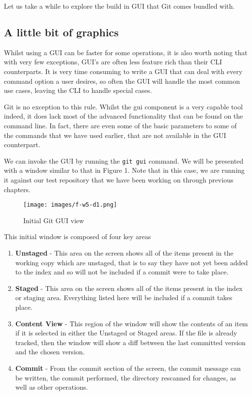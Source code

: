 Let us take a while to explore the build in GUI that Git comes bundled with.

\subsection{A little bit of graphics}
Whilst using a GUI can be faster for some operations, it is also worth noting that with very few exceptions, GUI's are often less feature rich than their CLI counterparts.  It is very time consuming to write a GUI that can deal with every command option a user desires, so often the GUI will handle the most common use cases, leaving the CLI to handle special cases.

Git is no exception to this rule.  Whilst the gui component is a very capable tool indeed, it does lack most of the advanced functionality that can be found on the command line.  In fact, there are even some of the basic parameters to some of the commands that we have used earlier, that are not available in the GUI counterpart.

We can invoke the GUI by running the \texttt{git gui} command.  We will be presented with a window similar to that in Figure 1.  Note that in this case, we are running it against our test repository that we have been working on through previous chapters.

\begin{figure}[hbt]
\centering
\texttt{[image: images/f-w5-d1.png]}
\caption{Initial Git GUI view}
\end{figure}

This initial window is composed of four key areas
\begin{enumerate}
\item \textbf{Unstaged} - This area on the screen shows all of the items present in the working copy which are unstaged, that is to say they have not yet been added to the index and so will not be included if a commit were to take place.
\item \textbf{Staged} - This area on the screen shows all of the items present in the index or staging area.  Everything listed here will be included if a commit takes place.
\item \textbf{Content View} - This region of the window will show the contents of an item if it is selected in either the Unstaged or Staged areas.  If the file is already tracked, then the window will show a diff between the last committed version and the chosen version.
\item \textbf{Commit} - From the commit section of the screen, the commit message can be written, the commit performed, the directory rescanned for changes, as well as other operations.
\end{enumerate}

